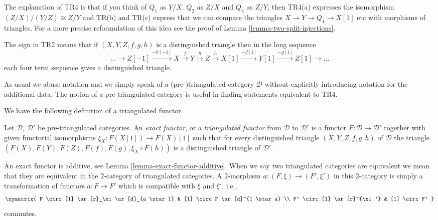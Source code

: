 \noindent
The explanation of TR4 is that if you think of $Q_1$ as
$Y/X$, $Q_2$ as $Z/X$ and $Q_3$ as $Z/Y$, then TR4(a) expresses
the isomorphism $(Z/X)/(Y/Z) \cong Z/Y$ and TR(b) and TR(c)
express that we can compare the triangles $X \to Y \to Q_1 \to X[1]$
etc with morphisms of triangles. For a more precise reformulation
of this idea see the proof of Lemma \ref{lemma-two-split-injections}.

\medskip\noindent
The sign in TR2 means that if $(X, Y, Z, f, g, h)$ is a distinguished triangle
then in the long sequence
\begin{equation}
\label{equation-rotate}
\ldots \to
Z[-1] \xrightarrow{-h[-1]}
X \xrightarrow{f}
Y \xrightarrow{g}
Z \xrightarrow{h}
X[1] \xrightarrow{-f[1]}
Y[1] \xrightarrow{-g[1]}
Z[1] \to \ldots
\end{equation}
each four term sequence gives a distinguished triangle.

\medskip\noindent
As usual we abuse notation and we simply speak of a (pre-)triangulated
category $\mathcal{D}$ without explicitly introducing notation for the
additional data. The notion of a pre-triangulated category is
useful in finding statements equivalent to TR4.

\medskip\noindent
We have the following definition of a triangulated functor.

\begin{definition}
\label{definition-exact-functor-triangulated-categories}
Let $\mathcal{D}$, $\mathcal{D}'$ be pre-triangulated
categories. An {\it exact functor}, or a {\it triangulated functor}
from $\mathcal{D}$ to $\mathcal{D}'$ is a functor
$F : \mathcal{D} \to \mathcal{D}'$ together
with given functorial isomorphisms $\xi_X : F(X[1]) \to F(X)[1]$
such that for every distinguished triangle
$(X, Y, Z, f, g, h)$ of $\mathcal{D}$ the triangle
$(F(X), F(Y), F(Z), F(f), F(g), \xi_X \circ F(h))$
is a distinguished triangle of $\mathcal{D}'$.
\end{definition}

\noindent
An exact functor is additive, see
Lemma \ref{lemma-exact-functor-additive}.
When we say two triangulated categories are equivalent we mean that
they are equivalent in the $2$-category of triangulated categories.
A $2$-morphism $a : (F, \xi) \to (F', \xi')$ in this $2$-category is
simply a transformation of functors $a : F \to F'$ which is compatible
with $\xi$ and $\xi'$, i.e.,
$$
\xymatrix{
F \circ [1] \ar[r]_\xi \ar[d]_{a \star 1} & [1] \circ F \ar[d]^{1 \star a} \\
F' \circ [1] \ar[r]^{\xi'} & [1] \circ F'
}
$$
commutes.

